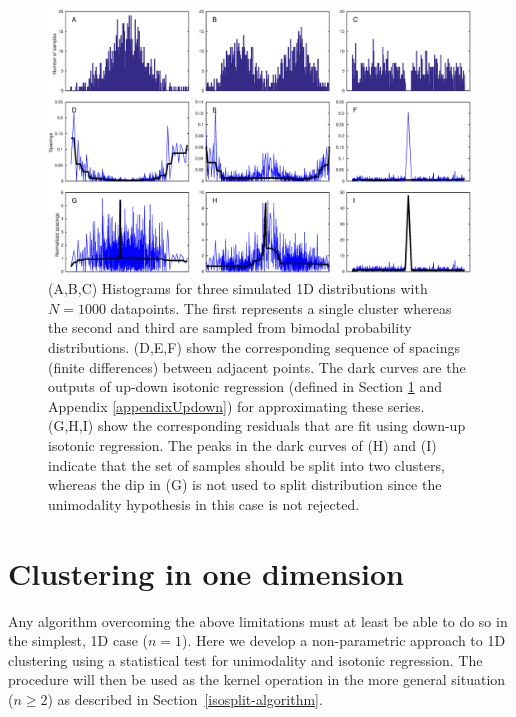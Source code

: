 \documentclass[10pt]{article}
\begin{document}
\begin{figure}
\begin{center}
\includegraphics[width=5.5in]{images/illustration_1d.eps}
\end{center}
\caption{
(A,B,C) Histograms for three simulated 1D distributions with $N=1000$ datapoints. The first represents a single cluster whereas the second and third are sampled from bimodal probability distributions. (D,E,F) show the corresponding sequence of spacings (finite differences) between adjacent points. The dark curves are the outputs of up-down isotonic regression (defined in Section \ref{clustering_1d} and Appendix \ref{appendixUpdown}) for approximating these series. (G,H,I) show the corresponding residuals that are fit using down-up isotonic regression. The peaks in the dark curves of (H) and (I) indicate that the set of samples should be split into two clusters, whereas the dip in (G) is not used to split distribution since the unimodality hypothesis in this case is not rejected.
}
\label{fig:plots_1d}
\end{figure}

\section {Clustering in one dimension}
\label{clustering_1d}

Any algorithm overcoming the above limitations must at least be able to do so in the simplest, 1D case ($n=1$). Here we develop a non-parametric approach to 1D clustering using a statistical test for unimodality and isotonic regression. The procedure will then be used as the kernel operation in the more general situation ($n\geq2$) as described in Section~\ref{isosplit-algorithm}.
\end{document}
